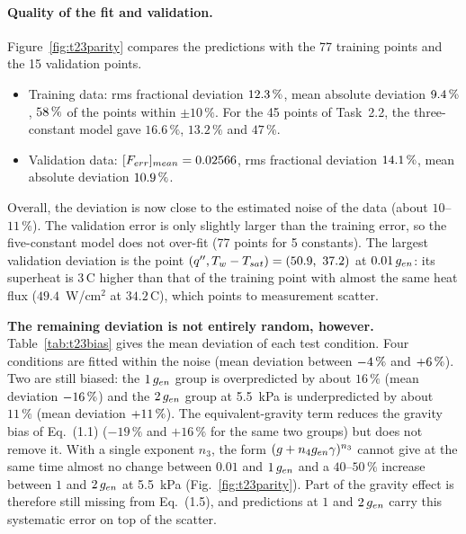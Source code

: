 \paragraph{Quality of the fit and validation.}
Figure~\ref{fig:t23parity} compares the predictions with the 77 training points and the 15
validation points.
\begin{itemize}
  \item Training data: rms fractional deviation $12.3\,\%$, mean absolute deviation
        $9.4\,\%$, $58\,\%$ of the points within $\pm10\,\%$. For the
        45 points of Task~2.2, the three-constant model gave $16.6\,\%$, $13.2\,\%$ and $47\,\%$.
  \item Validation data: $[F_{err}]_{mean}=0.02566$, rms fractional deviation $14.1\,\%$, mean
        absolute deviation $10.9\,\%$.
\end{itemize}
Overall, the deviation is now close to the estimated noise of the data (about $10$--$11\,\%$). The
validation error is only slightly larger than the training error, so the five-constant model does not
over-fit (77 points for 5 constants). The largest validation deviation is the point
$(q'',T_w-T_{sat})=(50.9,\ 37.2)$ at $0.01\,g_{en}$: its superheat is 3\,\textdegree C higher than that of the
training point with almost the same heat flux ($49.4$~W/cm$^2$ at $34.2$\,\textdegree C), which points to measurement scatter.

\textbf{The remaining deviation is not entirely random, however.} Table~\ref{tab:t23bias} gives the mean
deviation of each test condition. Four conditions are fitted within the noise (mean deviation between
$-4\,\%$ and $+6\,\%$). Two are still biased: the $1\,g_{en}$ group
is overpredicted by about $16\,\%$ (mean deviation $-16\,\%$) and the $2\,g_{en}$ group at 5.5~kPa is
underpredicted by about $11\,\%$ (mean deviation $+11\,\%$). The equivalent-gravity term reduces the
gravity bias of Eq.~(1.1) ($-19\,\%$ and $+16\,\%$ for the same two groups) but does not remove it.
With a single exponent $n_3$, the form $(g+n_4g_{en}\gamma)^{n_3}$ cannot give at the same time almost no
change between $0.01$ and $1\,g_{en}$ and a $40$--$50\,\%$ increase between $1$ and $2\,g_{en}$ at 5.5~kPa
(Fig.~\ref{fig:t23parity}). Part of the gravity effect is therefore still missing from Eq.~(1.5), and
predictions at $1$ and $2\,g_{en}$ carry this systematic error on top of the scatter.

\begin{table}[H]
\centering\small
\caption{Task 2.3: mean and rms deviation $(\qpp_{exp}-\qpp_{pred})/\qpp_{pred}$ for each test condition
(training data). Mean deviations larger than $10\,\%$ are in bold. Last column: the three-constant fit
of Task~2.2 for the groups it was fitted on.}
\label{tab:t23bias}
\end{table}

